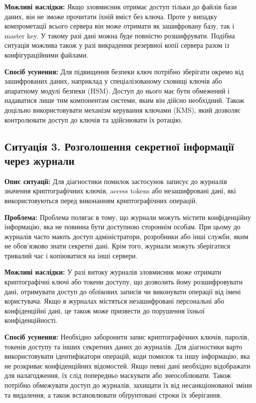 \textbf{Можливі наслідки:}
Якщо зловмисник отримає доступ тільки до файлів бази даних, він не зможе прочитати їхній вміст без ключа. 
Проте у випадку компрометації всього сервера він може отримати як зашифровану базу, так і master key. 
У такому разі дані можна буде повністю розшифрувати. Подібна ситуація можлива також у разі викрадення резервної 
копії сервера разом із конфігураційними файлами.

\textbf{Спосіб усунення:}
Для підвищення безпеки ключ потрібно зберігати окремо від зашифрованих даних, наприклад у спеціалізованому сховищі 
ключів або апаратному модулі безпеки (HSM). Доступ до нього має бути обмежений і надаватися лише тим компонентам системи, 
яким він дійсно необхідний. Також доцільно використовувати механізм керування ключами (KMS), який дозволяє контролювати 
доступ до ключів та здійснювати їх ротацію.


\subsection{Ситуація 3. Розголошення секретної інформації через журнали}

\textbf{Опис ситуації:}
Для діагностики помилок застосунок записує до журналів значення криптографічних ключів, 
access tokens або незашифровані дані, які використовуються перед виконанням криптографічних операцій.

\textbf{Проблема:}
Проблема полягає в тому, що журнали можуть містити конфіденційну інформацію, яка не повинна бути доступною 
стороннім особам. При цьому до журналів часто мають доступ адміністратори, розробники або інші служби, 
яким не обов'язково знати секретні дані. Крім того, журнали можуть зберігатися тривалий час і копіюватися на інші сервери.

\textbf{Можливі наслідки:}
У разі витоку журналів зловмисник може отримати криптографічні ключі або токени доступу, що дозволить йому розшифровувати дані,
отримувати доступ до облікових записів чи виконувати операції від імені користувача. Якщо в журналах містяться незашифровані 
персональні або конфіденційні дані, це також може призвести до порушення їхньої конфіденційності.

\textbf{Спосіб усунення:}
Необхідно заборонити запис криптографічних ключів, паролів, токенів доступу та інших секретних даних до журналів. Для діагностики 
варто використовувати ідентифікатори операцій, коди помилок та іншу інформацію, яка не розкриває конфіденційних відомостей. 
Якщо певні дані необхідно відображати для налагодження, їх слід попередньо маскувати або знеособлювати. Також потрібно обмежувати доступ до журналів, 
захищати їх від несанкціонованої зміни та видалення, а також встановлювати обґрунтовані строки їх зберігання.


